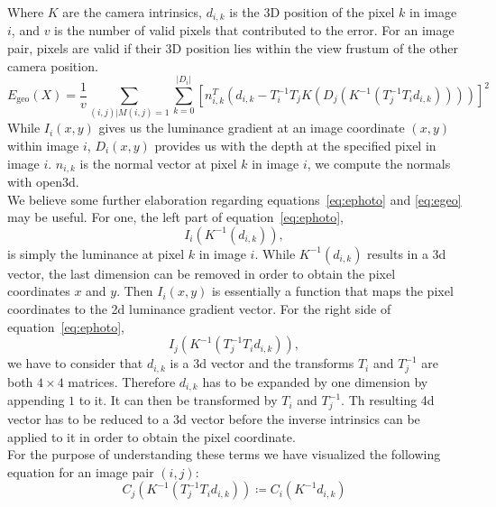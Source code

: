         Where $K$ are the camera intrinsics, $d_{i,k}$ is the 3D position of the pixel $k$ in image $i$, and $v$ is the number of valid pixels that contributed to the error.
        For an image pair, pixels are valid if their 3D position lies within the view frustum of the other camera position.
        \begin{equation}
            E_{\text{geo}}(X) =
            \frac{1}{v} \sum_{(i,j) | M(i,j)=1}\sum_{k=0}^{\left\lvert D_i \right\rvert}
            \left[
            n_{i,k}^T \left(d_{i,k} - T_i^{-1}T_jK \left( D_j \left( K^{-1}\left( T_j^{-1}T_id_{i,k} \right) \right) \right)\right)
            \right]^2
            \label{eq:egeo}
        \end{equation}
        While $I_i(x,y)$ gives us the luminance gradient at an image coordinate $(x,y)$ within image $i$, $D_i(x,y)$ provides us with the depth at the specified pixel in image $i$.
        $n_{i,k}$ is the normal vector at pixel $k$ in image $i$, we compute the normals with open3d.\\
        We believe some further elaboration regarding equations~\ref{eq:ephoto} and \ref{eq:egeo} may be useful.
        For one, the left part of equation~\ref{eq:ephoto},
        \begin{equation*}
            I_i(K^{-1}(d_{i,k})),
        \end{equation*}
        is simply the luminance at pixel $k$ in image $i$.
        While $K^{-1}(d_{i,k})$ results in a 3d vector, the last dimension can be removed in order to obtain the pixel coordinates $x$ and $y$.
        Then $I_i(x,y)$ is essentially a function that maps the pixel coordinates to the 2d luminance gradient vector.
        For the right side of equation~\ref{eq:ephoto},
        \begin{equation*}
            I_j(K^{-1}(T_j^{-1}T_id_{i,k})),
        \end{equation*}
        we have to consider that $d_{i,k}$ is a 3d vector and the transforms $T_i$ and $T_j^{-1}$ are both $4 \times 4$ matrices.
        Therefore $d_{i,k}$ has to be expanded by one dimension by appending $1$ to it.
        It can then be transformed by $T_i$ and $T_j^{-1}$.
        Th resulting 4d vector has to be reduced to a 3d vector before the inverse intrinsics can be applied to it in order to obtain the pixel coordinate.\\
        For the purpose of understanding these terms we have visualized the following equation for an image pair $(i, j)$:
        \begin{equation}
            C_j(K^{-1}(T_j^{-1}T_id_{i,k})) \coloneqq C_i(K^{-1}d_{i,k})
            \label{eq:vis_perspective}
        \end{equation}
